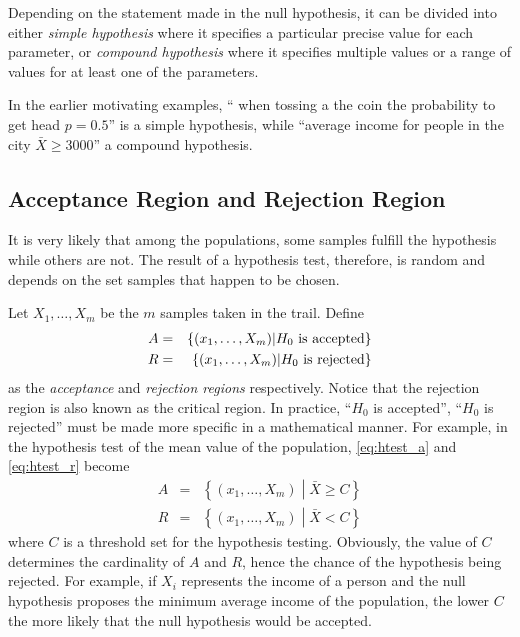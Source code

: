 Depending on the statement made in the null hypothesis, it can be divided into either \textit{simple hypothesis} where it specifies a particular precise value for each parameter, or \textit{compound hypothesis} where it specifies multiple values or a range of values for at least one of the parameters. 

In the earlier motivating examples, `` when tossing a the coin the probability to get head $p=0.5$'' is a simple hypothesis, while ``average income for people in the city $\bar{X}\geq 3000$'' a compound hypothesis.

\subsection{Acceptance Region and Rejection Region}

It is very likely that among the populations, some samples fulfill the hypothesis while others are not. The result of a hypothesis test, therefore, is random and depends on the set samples that happen to be chosen.

Let $X_1, \ldots, X_m$ be the $m$ samples taken in the trail. Define
\begin{eqnarray}
	A &=& \left\{\left(x_1, \ldots, X_m\right)\middle| H_0 \textup{~is accepted}\right\} \label{eq:htest_a} \\
	R &=& \left\{\left(x_1, \ldots, X_m\right)\middle| H_0 \textup{~is rejected}\right\} \label{eq:htest_r}
\end{eqnarray}
as the \textit{acceptance} and \textit{rejection regions} respectively. Notice that the rejection region is also known as the critical region. In practice, ``$H_0$ is accepted'', ``$H_0$ is rejected'' must be made more specific in a mathematical manner. For example, in the hypothesis test of the mean value of the population, \eqref{eq:htest_a} and \eqref{eq:htest_r} become
\begin{eqnarray}
	A &=& \left\{\left(x_1, \ldots, X_m\right)\middle| \bar{X} \geq C \right\} \nonumber \\
R &=& \left\{\left(x_1, \ldots, X_m\right)\middle| \bar{X}<C \right\} \nonumber
\end{eqnarray}
where $C$ is a threshold set for the hypothesis testing. Obviously, the value of $C$ determines the cardinality of $A$ and $R$, hence the chance of the hypothesis being rejected. For example, if $X_i$ represents the income of a person and the null hypothesis proposes the minimum average income of the population, the lower $C$ the more likely that the null hypothesis would be accepted.


